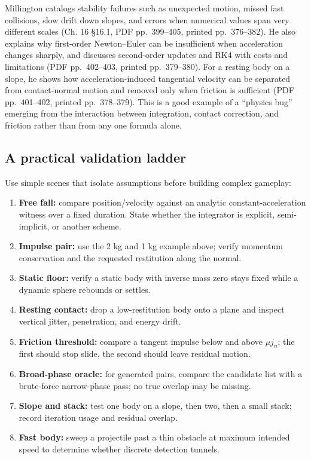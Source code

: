 Millington catalogs stability failures such as unexpected motion, missed fast collisions, slow drift down slopes, and errors when numerical values span very different scales (Ch. 16 §16.1, PDF pp.~399--405, printed pp.~376--382). He also explains why first-order Newton--Euler can be insufficient when acceleration changes sharply, and discusses second-order updates and RK4 with costs and limitations (PDF pp.~402--403, printed pp.~379--380). For a resting body on a slope, he shows how acceleration-induced tangential velocity can be separated from contact-normal motion and removed only when friction is sufficient (PDF pp.~401--402, printed pp.~378--379). This is a good example of a ``physics bug'' emerging from the interaction between integration, contact correction, and friction rather than from any one formula alone.

\subsection{A practical validation ladder}\label{06-engine-ii-ch033-a-practical-validation-ladder}

Use simple scenes that isolate assumptions before building complex gameplay:

\begin{enumerate}
\def\labelenumi{\arabic{enumi}.}
\tightlist
\item
  \textbf{Free fall:} compare position/velocity against an analytic constant-acceleration witness over a fixed duration. State whether the integrator is explicit, semi-implicit, or another scheme.
\item
  \textbf{Impulse pair:} use the 2 kg and 1 kg example above; verify momentum conservation and the requested restitution along the normal.
\item
  \textbf{Static floor:} verify a static body with inverse mass zero stays fixed while a dynamic sphere rebounds or settles.
\item
  \textbf{Resting contact:} drop a low-restitution body onto a plane and inspect vertical jitter, penetration, and energy drift.
\item
  \textbf{Friction threshold:} compare a tangent impulse below and above \(\mu j_n\); the first should stop slide, the second should leave residual motion.
\item
  \textbf{Broad-phase oracle:} for generated pairs, compare the candidate list with a brute-force narrow-phase pass; no true overlap may be missing.
\item
  \textbf{Slope and stack:} test one body on a slope, then two, then a small stack; record iteration usage and residual overlap.
\item
  \textbf{Fast body:} sweep a projectile past a thin obstacle at maximum intended speed to determine whether discrete detection tunnels.
\end{enumerate}

